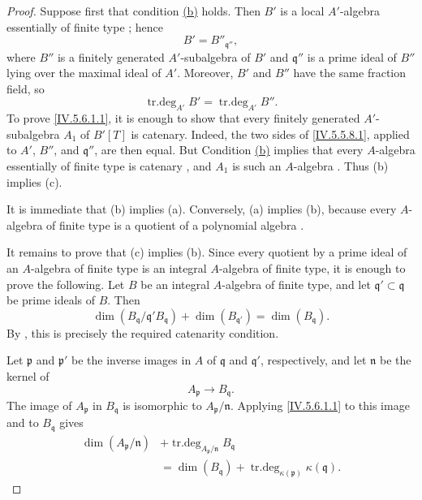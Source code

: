 \begin{proof}
Suppose first that condition
{\hyperlink{ega4.c04.sec.5-6-1-b}{\textup{(b)}}} holds.  Then $B'$ is a local
$A'$-algebra essentially of finite type ; hence
\[
B'=B''_{\mathfrak q''},
\]
where $B''$ is a finitely generated $A'$-subalgebra of $B'$ and
$\mathfrak q''$ is a prime ideal of $B''$ lying over the maximal
ideal of $A'$.  Moreover, $B'$ and $B''$ have the same fraction
field, so
\[
\operatorname{tr.deg}_{A'}B'
 =\operatorname{tr.deg}_{A'}B''.
\]
To prove \eqref{IV.5.6.1.1}, it is enough to show that every
finitely generated $A'$-subalgebra $A_1$ of $B'[T]$ is catenary.
Indeed, the two sides of \eqref{IV.5.5.8.1}, applied to $A'$, $B''$,
and $\mathfrak q''$, are then equal.  But
Condition {\hyperlink{ega4.c04.sec.5-6-1-b}{\textup{(b)}}} implies that every
$A$-algebra essentially of
finite type is catenary , and $A_1$ is such an
$A$-algebra .  Thus (b) implies (c).

It is immediate that (b) implies (a).  Conversely, (a) implies (b),
because every $A$-algebra of finite type is a quotient of a
polynomial algebra .

It remains to prove that (c) implies (b).  Since every quotient by a
prime ideal of an $A$-algebra of finite type is an integral
$A$-algebra of finite type, it is enough to prove the following.
Let $B$ be an integral $A$-algebra of finite type, and let
$\mathfrak q'\subset\mathfrak q$ be prime ideals of $B$.  Then
\begin{equation}
\dim(B_{\mathfrak q}/\mathfrak q'B_{\mathfrak q})
 +\dim(B_{\mathfrak q'})
 =\dim(B_{\mathfrak q}).
\tag{5.6.1.2}\label{IV.5.6.1.2}
\end{equation}
By , this is precisely the required catenarity
condition.


Let $\mathfrak p$ and $\mathfrak p'$ be the inverse images in $A$ of
$\mathfrak q$ and $\mathfrak q'$, respectively, and let
$\mathfrak n$ be the kernel of
\[
A_{\mathfrak p}\longrightarrow B_{\mathfrak q}.
\]
The image of $A_{\mathfrak p}$ in $B_{\mathfrak q}$ is isomorphic to
$A_{\mathfrak p}/\mathfrak n$.  Applying
\eqref{IV.5.6.1.1} to this image and to $B_{\mathfrak q}$ gives
\begin{equation}
\begin{split}
\dim(A_{\mathfrak p}/\mathfrak n)
 &+\operatorname{tr.deg}_{A_{\mathfrak p}/\mathfrak n}
       B_{\mathfrak q}\\
 &=\dim(B_{\mathfrak q})
   +\operatorname{tr.deg}_{\kappa(\mathfrak p)}
       \kappa(\mathfrak q).
\end{split}
\tag{5.6.1.3}\label{IV.5.6.1.3}
\end{equation}


\end{proof}
